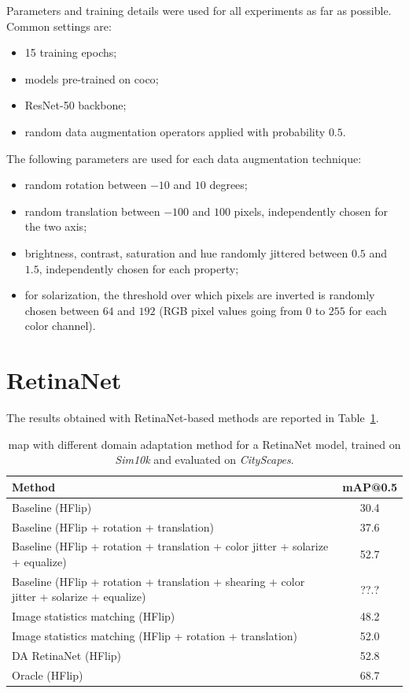\documentclass[%
    corpo=12pt,
    twoside,
    stile=classica,   
    tipotesi=magistrale,
    evenboxes,
    english
]{toptesi}
\begin{document}
Parameters and training details were used for all experiments as far as possible. Common settings are:
\begin{itemize}
	\item 15 training epochs;
	\item models pre-trained on \gls{coco};
	\item ResNet-50 backbone;
	\item random data augmentation operators applied with probability $ 0.5 $.
\end{itemize}
The following parameters are used for each data augmentation technique:
\begin{itemize}
	\item random rotation between $ -10 $ and $ 10 $ degrees;
	\item random translation between $ -100 $ and $ 100 $ pixels, independently chosen for the two axis;
	\item brightness, contrast, saturation and hue randomly jittered between $ 0.5 $ and $ 1.5 $, independently chosen for each property;
	\item for solarization, the threshold over which pixels are inverted is randomly chosen between $ 64 $ and $ 192 $ (RGB pixel values going from $ 0 $ to $ 255 $ for each color channel).
\end{itemize}

\section{RetinaNet}
The results obtained with RetinaNet-based methods are reported in Table~\ref{table:retinanet}.

\begin{table}[ht!]
	\centering
	\begin{tabularx}{\linewidth}{|X|c|}
		\hline
		Method  &   mAP@0.5 \\
		\hline\hline
		Baseline (HFlip)       &   30.4   \\
		\hline
		Baseline (HFlip + rotation + translation)      &   37.6   \\
		\hline
		Baseline (HFlip + rotation + translation + color jitter + solarize + equalize)      &   52.7   \\
		\hline
		Baseline (HFlip + rotation + translation + shearing + color jitter + solarize + equalize)      &   ??.?   \\
		\hline
		Image statistics matching (HFlip)  &   48.2    \\
		\hline
		Image statistics matching (HFlip + rotation + translation)  &   52.0    \\
		\hline
		DA RetinaNet (HFlip)   &   52.8    \\
		\hline\hline
		Oracle (HFlip) &   68.7    \\
		\hline
	\end{tabularx}
	\caption{\gls{map} with different domain adaptation method for a RetinaNet model, trained on \textit{Sim10k} and evaluated on \textit{CityScapes}.}
	\label{table:retinanet}
\end{table}
\end{document}
